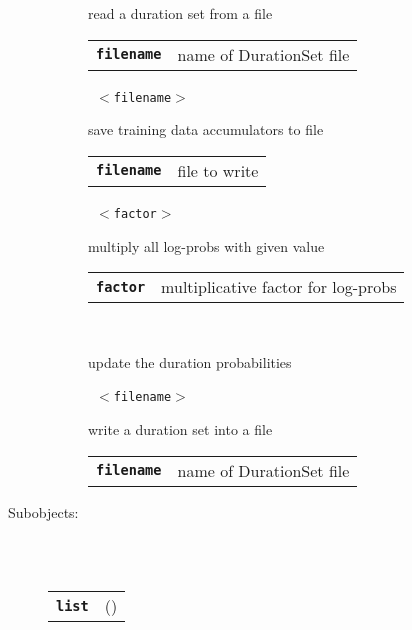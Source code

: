 \begin{description}
\begin{description}
        read a duration set from a file

      \begin{tabular}{ll}
 \texttt{\textbf{filename}} &  name of DurationSet file  \\
      \end{tabular}
       \texttt{ $<$filename$>$} \

        save training data accumulators to file

      \begin{tabular}{ll}
 \texttt{\textbf{filename}} &  file to write  \\
      \end{tabular}
       \texttt{ $<$factor$>$} \

        multiply all log-probs with given value

      \begin{tabular}{ll}
 \texttt{\textbf{factor}} &  multiplicative factor for log-probs  \\
      \end{tabular}
       \texttt{} \

        update the duration probabilities

       \texttt{ $<$filename$>$} \

        write a duration set into a file

      \begin{tabular}{ll}
 \texttt{\textbf{filename}} &  name of DurationSet file  \\
      \end{tabular}
    \end{description}

  \item[Subobjects:] \hfill \\
\ 
    \begin{tabular}{ll}
      \texttt{\textbf{list}} & (\Jref{module}{List}) \\
    \end{tabular}
\vspace{3mm}

\end{description}

